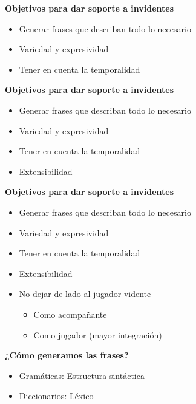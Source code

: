 \begin{tframe}{\textbf{Objetivos para dar soporte a invidentes}}
	\begin{itemize}
		\item Generar frases que describan todo lo necesario
		\item Variedad y expresividad
		\item<+-| alert@+> Tener en cuenta la temporalidad
	\end{itemize}
\end{tframe}

\begin{tframe}{\textbf{Objetivos para dar soporte a invidentes}}
	\begin{itemize}
		\item Generar frases que describan todo lo necesario
		\item Variedad y expresividad
		\item Tener en cuenta la temporalidad
		\item<+-| alert@+> Extensibilidad
	\end{itemize}
\end{tframe}

\begin{tframe}{\textbf{Objetivos para dar soporte a invidentes}}
	\begin{itemize}
		\item Generar frases que describan todo lo necesario
		\item Variedad y expresividad
		\item Tener en cuenta la temporalidad
		\item Extensibilidad
		\item<+-| alert@+> No dejar de lado al jugador vidente
		\begin{itemize}
			\item Como acompañante
			\item Como jugador (mayor integración)
		\end{itemize}
	\end{itemize}
\end{tframe}


\begin{tframe}{\textbf{¿Cómo generamos las frases?}}
	\begin{itemize}
		\item Gramáticas: Estructura sintáctica
		\item Diccionarios: Léxico
	\end{itemize}
\end{tframe}


